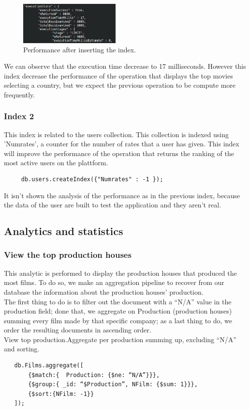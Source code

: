 \documentclass[a4paper, oneside]{article}
\begin{document}
\begin{figure}[H]
\centering
\includegraphics[width=0.45\textwidth]{./images/screens/timeIndex} 
\caption{Performance after inserting the index.}
\label{fig:admin1}
\end{figure}
We can observe that the execution time decrease to 17 milliseconds.
However this index decrease the performance of the operation that displays the top movies selecting a country, but we expect the previous operation to be compute more frequently.

\subsubsection{Index 2}
This index is related to the users collection. This collection is indexed using 'Numrates', a counter for the number of rates that a user has given.
This index will improve the performance of the operation that returns the ranking of the most active users on the plattform.
\begin{verbatim}
     db.users.createIndex({"Numrates" : -1 });
\end{verbatim}
It isn't shown the analysis of the performance as in the previous index, because the data of the user are built to test the application and they aren't real.

\subsection{Analytics and statistics}
\subsubsection{View the top production houses}
This analytic is performed to display the production houses that produced the most films. To do so, we make an aggregation pipeline to recover from our database the information about the production houses’ production. \\
The first thing to do is to filter out the document with a “N/A” value in the production field; done that, we aggregate on Production (production houses) summing every film made by that specific company; as a last thing to do, we order the resulting documents in ascending order.\\
View top production.Aggregate per production summing up, excluding “N/A” and sorting.
\begin{verbatim}
   db.Films.aggregate([
       {$match:{  Production: {$ne: “N/A”}}},
       {$group:{ _id: “$Production”, NFilm: {$sum: 1}}},
       {$sort:{NFilm: -1}}
   ]);
\end{verbatim}
\end{document}
